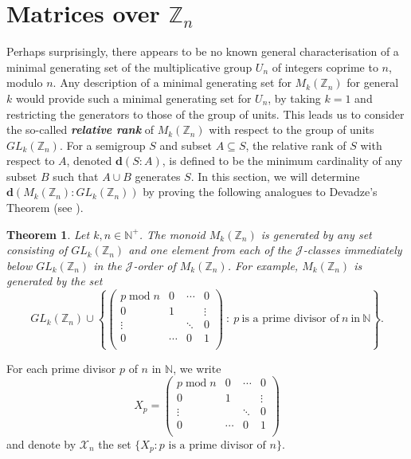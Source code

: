 \documentclass[11pt]{article}
\newtheorem{thm}{Theorem}[subsection]
\newcommand{\defn}[1]{\textbf{\textit{#1}}}
\numberwithin{equation}{section}
\newcommand{\set}[2]{\ensuremath{\{#1 : #2 \}}}
\newcommand{\J}{\mathscr{J}}
\newcommand{\N}{\mathbb{N}}
\newcommand{\Np}{\N^{+}}
\newcommand{\Z}{\mathbb{Z}}
\renewcommand{\d}{\mathbf{d}}
\begin{document}

\section{Matrices over $\mathbb{Z}_n$}
\label{sec:IntegersModN}
\setcounter{subsection}{1}

Perhaps surprisingly, there appears to be no known general characterisation of a
minimal generating set of the multiplicative group $U_n$ of integers coprime to
$n$, modulo $n$. Any description of a minimal generating set for $M_k(\Z_n)$ for
general $k$ would provide such a minimal generating set for $U_n$, by taking $k
= 1$ and restricting the generators to those of the group of units. This leads
us to consider the so-called \defn{relative rank} of $M_k(\Z_n)$ with respect to
the group of units $GL_k(\Z_n)$. For a semigroup $S$ and subset $A \subseteq S$,
the relative rank of $S$ with respect to $A$, denoted $\d(S:A)$, is defined to
be the minimum cardinality of any subset $B$ such that $A \cup B$ generates $S$.
In this section, we will determine $\d(M_k(\Z_n):GL_k(\Z_n))$ by proving the
following analogues to Devadze's Theorem (see ).

\begin{thm}
    Let $k,n \in \Np$.
    The monoid $M_k(\Z_n)$ is generated by any set consisting of $GL_k(\Z_n)$
    and one element from each of the $\J$-classes
    immediately below $GL_k(\Z_n)$ in the $\J$-order of $M_k(\Z_n)$.
    For example,
    $M_k(\Z_n)$ is generated by the set
    $$
    GL_k(\Z_n)
    \cup
    \left\{
    \begin{pmatrix}
      p \operatorname{mod} n & 0      & \cdots & 0      \\
      0       & 1      &        & \vdots \\
      \vdots  &        & \ddots & 0      \\
      0       & \cdots & 0      & 1      \\
     \end{pmatrix}
     \ :\
     p\ \text{is a prime divisor of}\ n\ \text{in}\ \mathbb{N}
     \right\}.
     $$
\end{thm}


For each prime divisor $p$ of $n$ in $\N$, we write
  $$X_p =
    \begin{pmatrix}
      p \operatorname{mod} n & 0      & \cdots & 0      \\
      0       & 1      &        & \vdots \\
      \vdots  &        & \ddots & 0      \\
      0       & \cdots & 0      & 1      \\
    \end{pmatrix}$$
and denote by $\mathcal{X}_n$ the set $\set{X_p}{p \text{ is a prime divisor of
  } n}$.
\end{document}
